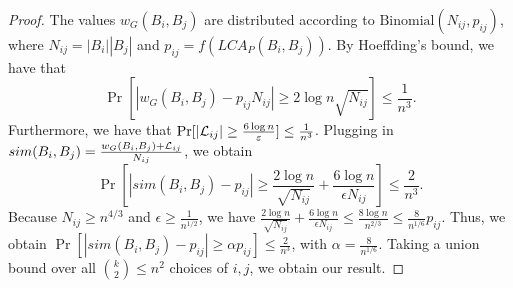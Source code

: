 \begin{proof}
The values $w_G(B_i, B_j)$ are distributed according to $\text{Binomial}(N_{ij}, p_{ij})$, where $N_{ij} = |B_i||B_j|$ and $p_{ij} = f(LCA_P(B_i, B_j))$. By Hoeffding's bound, we have that
\[
    \Pr[|w_G(B_i, B_j) - p_{ij}N_{ij}| \geq 2 \log n \sqrt{N_{ij}}] \leq \frac{1}{n^3}.
\]
Furthermore, we have that $\Pr[|\mathcal{L}_{ij}| \geq \frac{6 \log n}{\varepsilon}] \leq \frac{1}{n^3}$. Plugging in $sim(B_i, B_j) = \frac{w_G(B_i, B_j) + \mathcal{L}_{ij}}{N_{ij}}$, we obtain
\[
    \Pr\left[|sim(B_i, B_j) - p_{ij}| \geq \frac{2 \log n}{\sqrt{N_{ij}}} + \frac{6 \log n}{\epsilon N_{ij}} \right] \leq \frac{2}{n^3}.
\]
Because $N_{ij} \geq n^{4/3}$ and $\epsilon \geq \frac{1}{n^{1/2}}$, we have $\frac{2 \log n}{\sqrt{N_{ij}}} + \frac{6 \log n}{\epsilon N_{ij}} \leq \frac{8 \log n}{n^{2/3}} \leq \frac{8}{n^{1/6}} p_{ij}$.
Thus, we obtain $\Pr[|sim(B_i, B_j) - p_{ij}| \geq \alpha p_{ij}] \leq \frac{2}{n^3}$, with $\alpha = \frac{8}{n^{1/6}}$. Taking a union bound over all $\binom{k}{2} \leq n^2$ choices of $i,j$, we obtain our result.
\end{proof}

